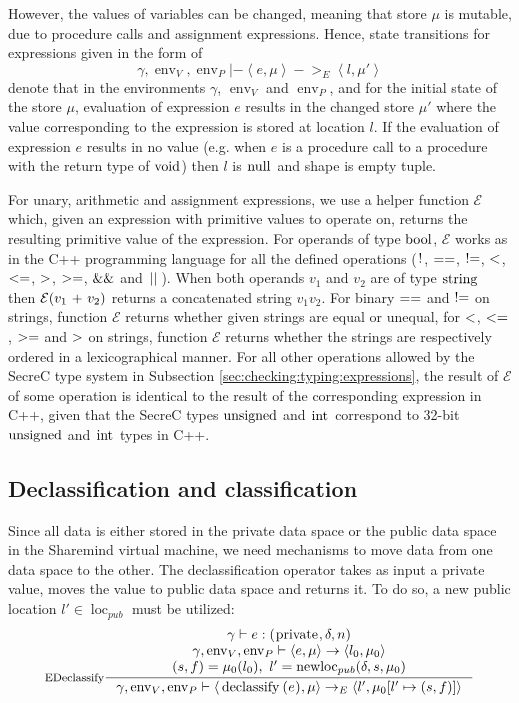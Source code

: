 \documentclass[a4paper, 10pt, draft]{report}
\DeclareMathOperator*{\env}{env}
\DeclareMathOperator*{\newloc}{newloc}
\newcommand{\mycode}[1]{\ensuremath{\mbox{\lstinline{#1}}}}
\begin{document}
However, the values of variables can be changed, meaning that store $\mu$ is
mutable, due to procedure calls and assignment expressions. Hence, state
transitions for expressions given in the form of
\[
\gamma, \operatorname{env}_V, \operatorname{env}_P |-
  \left\langle e, \mu \right\rangle ->_E \left\langle l, \mu' \right\rangle
\]
denote that in the environments $\gamma$, $\operatorname{env}_V$ and
$\operatorname{env}_P$, and for the initial state of the store $\mu$,
evaluation of expression $e$ results in the changed store $\mu'$ where the
value corresponding to the expression is stored at location $l$. If the
evaluation of expression $e$ results in no value (e.g. when $e$ is a
procedure call to a procedure with the return type of \mycode{void}) then
$l$ is \mycode{null} and shape is empty tuple.

For unary, arithmetic and assignment expressions, we use a helper function
$\mathcal{E}$ which, given an expression with primitive values to operate on,
returns the resulting primitive value of the expression. For operands of type
\mycode{bool}, $\mathcal{E}$ works as in the C++ programming language\cite{C++}
for all the defined operations (\mycode{!}, \mycode{==}, \mycode{!=},
\mycode{<}, \mycode{<=}, \mycode{>}, \mycode{>=}, \mycode{&&} and \mycode{||}).
When both operands $v_1$ and $v_2$ are of type \mycode{string} then
$\mathcal{E}\!\left(v_1\ \mycode{+}\ v_2\right)$ returns a concatenated string
$v_1v_2$. For binary \mycode{==} and \mycode{!=} on strings, function
$\mathcal{E}$ returns whether given strings are equal or unequal, for
\mycode{<}, \mycode{<=}, \mycode{>=} and \mycode{>} on strings, function
$\mathcal{E}$ returns whether the strings are respectively ordered in a
lexicographical manner. For all other operations allowed by the SecreC type
system in Subsection \ref{sec:checking:typing:expressions}, the result of
$\mathcal{E}$ of some operation is identical to the result of the corresponding
expression in C++, given that the SecreC types \mycode{unsigned} and
\mycode{int} correspond to 32-bit \mycode{unsigned} and \mycode{int} types in
C++.

\subsection{Declassification and classification}\label{sec:semantics:expr:declassify}

Since all data is either stored in the private data space or the public data
space in the Sharemind virtual machine, we need mechanisms to move data from
one data space to the other. The declassification operator takes as input a
private value, moves the value to public data space and returns it. To do so, a
new public location $l'\in \operatorname{loc}_{pub}$ must be utilized:
\[ \inference[EDeclassify]
{
  \gamma |- e : \left(\mycode{private}, \delta, n \right) \\
  \gamma, \env_V, \env_P |- \left< e, \mu \right> \to \left< l_0, \mu_0\right> \\
  (s, f) = \mu_0(l_0),\ l' = \newloc_{pub}(\delta, s, \mu_0)
}{
  \gamma, \env_V, \env_P |- \left< \mycode{declassify(}e\mycode{)}, \mu \right> \to_E \left< l', \mu_0[l' \mapsto (s, f)] \right>
} \]
\end{document}
